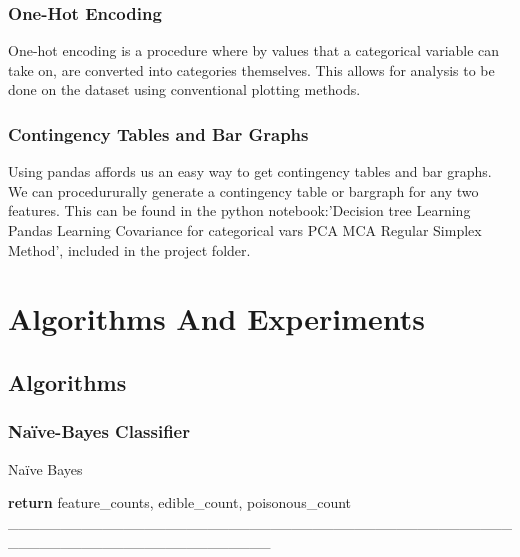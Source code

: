 \documentclass[12pt]{book}
\begin{document}
\subsection{One-Hot Encoding}
One-hot encoding is a procedure where by values that a categorical variable can take on, are converted into
categories themselves.
This allows for analysis to be done on the dataset using conventional plotting methods.

\subsection{Contingency Tables and Bar Graphs}
Using pandas affords us an easy way to get contingency tables and bar graphs.
We can procedururally generate a contingency table or bargraph for any two features.
This can be found in the python notebook:'Decision tree  Learning Pandas  Learning Covariance for categorical vars PCA MCA Regular Simplex Method',
included in the project folder.


\chapter{Algorithms And Experiments}
\section{Algorithms}
\subsection{Naïve-Bayes Classifier}

\begin{algorithm}
\caption{Naïve Bayes}\label{alg:euclid}
\begin{algorithmic}[l]
\Else
{}
\EndIf
{}
\EndFor
\EndFor
\State \textbf{return} {feature\_counts, edible\_count, poisonous\_count}
\EndProcedure
_________________________________________________________________________

\EndProcedure
\end{algorithmic}
\end{algorithm}
\end{document}
